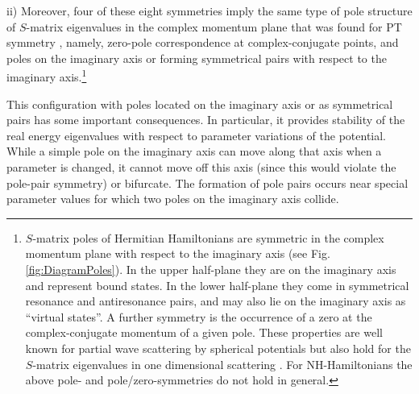 ii) Moreover,
four of these eight symmetries  imply the same
type of pole structure of $S$-matrix eigenvalues in the complex momentum plane that was found for PT symmetry \cite{Muga2004},
namely, zero-pole correspondence at complex-conjugate points, and poles on the imaginary axis or forming symmetrical pairs with respect to the imaginary
axis.\footnote{%
 $S$-matrix poles of Hermitian Hamiltonians   are symmetric in the complex momentum plane with respect to the imaginary axis (see Fig. \ref{fig:DiagramPoles}).
In the upper half-plane  they are on the imaginary axis and represent bound states.   In the lower half-plane they come in symmetrical
resonance and antiresonance pairs, and may also lie on the imaginary axis as ``virtual states''. A further symmetry is the occurrence of a zero
at the complex-conjugate momentum of a given pole. These properties are well known for partial wave scattering by spherical potentials
but also hold for the $S$-matrix eigenvalues in one dimensional scattering \cite{Muga2004}.
For NH-Hamiltonians  the above pole- and pole/zero-symmetries do not hold in general.}



This configuration with poles located on the imaginary  axis or as symmetrical pairs has some important consequences. In particular, it provides stability of the real energy eigenvalues with respect to parameter variations of the potential. While a simple pole on the imaginary axis can move along that axis when a parameter is changed, it cannot move off this axis (since this would violate the pole-pair symmetry) or bifurcate. The formation of pole pairs occurs near special  parameter values for which two poles on the imaginary axis collide.





